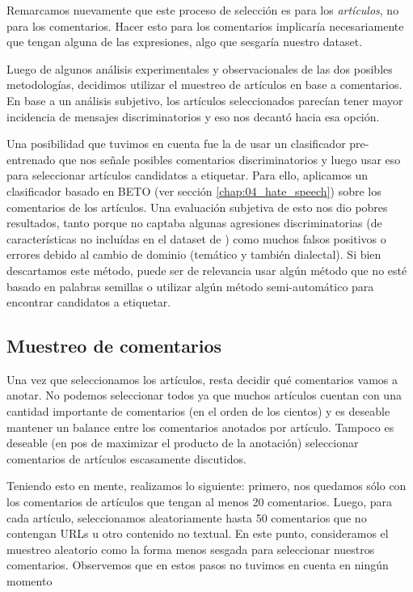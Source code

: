 Remarcamos nuevamente que este proceso de selección es para los \emph{artículos}, no para los comentarios. Hacer esto para los comentarios implicaría necesariamente que tengan alguna de las expresiones, algo que sesgaría nuestro dataset.

Luego de algunos análisis experimentales y observacionales de las dos posibles metodologías, decidimos utilizar el muestreo de artículos en base a comentarios. En base a un análisis subjetivo, los artículos seleccionados parecían tener mayor incidencia de mensajes discriminatorios y eso nos decantó hacia esa opción.

Una posibilidad que tuvimos en cuenta fue la de usar un clasificador pre-entrenado que nos señale posibles comentarios discriminatorios y luego usar eso para seleccionar artículos candidatos a etiquetar. Para ello, aplicamos un clasificador basado en BETO \citet{canete2020spanish} (ver sección \ref{chap:04_hate_speech}) sobre los comentarios de los artículos. Una evaluación subjetiva de esto nos dio pobres resultados, tanto porque no captaba algunas agresiones discriminatorias (de características no incluídas en el dataset de \citet{hateval2019semeval}) como muchos falsos positivos o errores debido al cambio de dominio (temático y también dialectal). Si bien descartamos este método, puede ser de relevancia usar algún método que no esté basado en palabras semillas o utilizar algún método semi-automático para encontrar candidatos a etiquetar.


\subsection{Muestreo de comentarios}

Una vez que seleccionamos los artículos, resta decidir qué comentarios vamos a anotar. No podemos seleccionar todos ya que muchos artículos cuentan con una cantidad importante de comentarios (en el orden de los cientos) y es deseable mantener un balance entre los comentarios anotados por artículo. Tampoco es deseable (en pos de maximizar el producto de la anotación) seleccionar comentarios de artículos escasamente discutidos.

Teniendo esto en mente, realizamos lo siguiente: primero, nos quedamos sólo con los comentarios de artículos que tengan al menos 20 comentarios. Luego, para cada artículo, seleccionamos aleatoriamente hasta 50 comentarios que no contengan URLs u otro contenido no textual. En este punto, consideramos el muestreo aleatorio como la forma menos sesgada para seleccionar nuestros comentarios. Observemos que en estos pasos no tuvimos en cuenta en ningún momento


